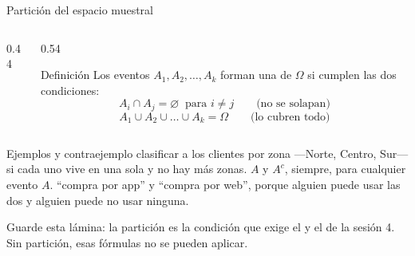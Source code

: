 \documentclass[aspectratio=169,10pt]{beamer}
\begin{document}
\begin{frame}{Partición del espacio muestral}
  \scriptsize
  \begin{columns}[T,onlytextwidth]
    \begin{column}{0.44\textwidth}
      \centering
    \end{column}
    \begin{column}{0.54\textwidth}
      \begin{block}{Definición}
        \tiny
        Los eventos $A_{1},A_{2},\dots,A_{k}$ forman una  de
        $\Omega$ si cumplen las dos condiciones:
        \[ A_{i}\cap A_{j} = \varnothing \ \text{ para } i\neq j
           \qquad\text{(no se solapan)} \]
        \[ A_{1}\cup A_{2}\cup\dots\cup A_{k} = \Omega
           \qquad\text{(lo cubren todo)} \]
      \end{block}
    \end{column}
  \end{columns}

  \vspace{0.08cm}
  \begin{exampleblock}{Ejemplos y contraejemplo}
    \tiny
     clasificar a los clientes por zona —Norte, Centro,
    Sur— si cada uno vive en una sola y no hay más zonas. \quad
     $A$ y $A^{c}$, siempre, para cualquier evento $A$. \quad
     ``compra por app'' y ``compra por web'', porque
    alguien puede usar las dos y alguien puede no usar ninguna.
  \end{exampleblock}

  \vspace{0.05cm}
  {\tiny\color{uniGris} Guarde esta lámina: la partición es la condición que
  exige el  y el
   de la sesión 4. Sin partición, esas fórmulas no
  se pueden aplicar.}
\end{frame}
\end{document}
